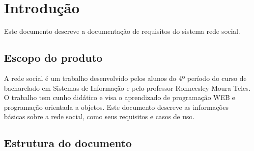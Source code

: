 \chapter{Introdução}
	
Este documento descreve a documentação de requisitos do sistema rede social.

\section{Escopo do produto}

A rede social é um trabalho desenvolvido pelos alunos do 4º período do curso de bacharelado
em Sistemas de Informação e pelo professor Ronneesley Moura Teles.
O trabalho tem cunho didático e visa o aprendizado de programação WEB e programação orientada a objetos.
Este documento descreve as informações básicas sobre a rede social, como seus requisitos e casos de uso.
  

\section{Estrutura do documento}